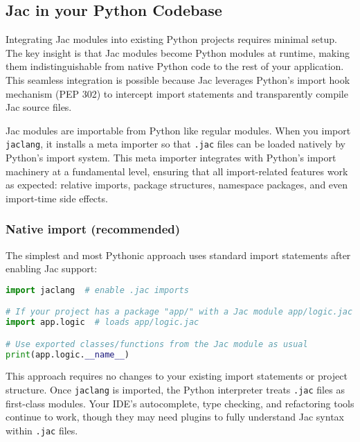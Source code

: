\subsection{Jac in your Python Codebase}

Integrating Jac modules into existing Python projects requires minimal setup. The key insight is that Jac modules become Python modules at runtime, making them indistinguishable from native Python code to the rest of your application. This seamless integration is possible because Jac leverages Python's import hook mechanism (PEP 302) to intercept import statements and transparently compile Jac source files.

Jac modules are importable from Python like regular modules. When you import \texttt{jaclang}, it installs a meta importer so that \texttt{.jac} files can be loaded natively by Python's import system. This meta importer integrates with Python's import machinery at a fundamental level, ensuring that all import-related features work as expected: relative imports, package structures, namespace packages, and even import-time side effects.

\subsubsection{Native import (recommended)}

The simplest and most Pythonic approach uses standard import statements after enabling Jac support:

\begin{lstlisting}[language=Python]
import jaclang  # enable .jac imports

# If your project has a package "app/" with a Jac module app/logic.jac
import app.logic  # loads app/logic.jac

# Use exported classes/functions from the Jac module as usual
print(app.logic.__name__)
\end{lstlisting}

This approach requires no changes to your existing import statements or project structure. Once \texttt{jaclang} is imported, the Python interpreter treats \texttt{.jac} files as first-class modules. Your IDE's autocomplete, type checking, and refactoring tools continue to work, though they may need plugins to fully understand Jac syntax within \texttt{.jac} files.

